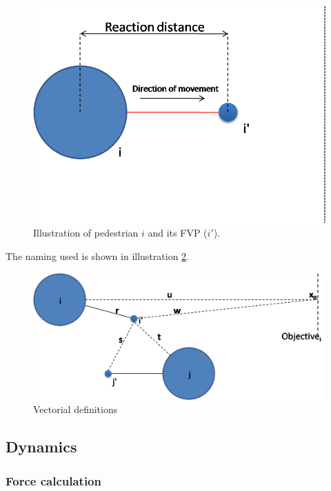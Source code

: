\documentclass[english]{article}
\begin{document}
\begin{figure}[h]
    \centering{}
    \includegraphics[scale=0.4]{pics/pedestrian-top} 
    \caption{\label{fig:pedestrian-geometry}Illustration of pedestrian $i$ and its FVP ($i'$).}
\end{figure}

The naming used is shown in illustration \ref{fig:pedestrian-vectors}.

\begin{figure}[h]
    \centering{}
    \includegraphics[scale=0.4]{pics/geometry}
    \caption{\label{fig:pedestrian-vectors}Vectorial definitions}
\end{figure}

\subsection{Dynamics}

\subsubsection{Force calculation}
\end{document}
